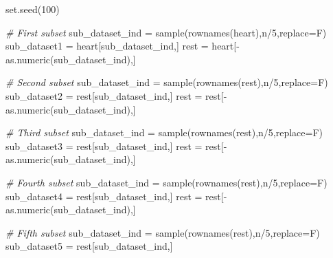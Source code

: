 \documentclass[
]{article}
\newenvironment{Shaded}{\begin{snugshade}}{\end{snugshade}}
\newcommand{\AttributeTok}[1]{\textcolor[rgb]{0.77,0.63,0.00}{#1}}
\newcommand{\CommentTok}[1]{\textcolor[rgb]{0.56,0.35,0.01}{\textit{#1}}}
\newcommand{\DecValTok}[1]{\textcolor[rgb]{0.00,0.00,0.81}{#1}}
\newcommand{\FunctionTok}[1]{\textcolor[rgb]{0.00,0.00,0.00}{#1}}
\newcommand{\NormalTok}[1]{#1}
\newcommand{\OtherTok}[1]{\textcolor[rgb]{0.56,0.35,0.01}{#1}}
\newcommand{\SpecialCharTok}[1]{\textcolor[rgb]{0.00,0.00,0.00}{#1}}
\begin{document}
\begin{Shaded}
\begin{Highlighting}[]
\FunctionTok{set.seed}\NormalTok{(}\DecValTok{100}\NormalTok{)}

\CommentTok{\# First subset}
\NormalTok{sub\_dataset\_ind }\OtherTok{=} \FunctionTok{sample}\NormalTok{(}\FunctionTok{rownames}\NormalTok{(heart),n}\SpecialCharTok{/}\DecValTok{5}\NormalTok{,}\AttributeTok{replace=}\NormalTok{F)}
\NormalTok{sub\_dataset1 }\OtherTok{=}\NormalTok{ heart[sub\_dataset\_ind,]}
\NormalTok{rest }\OtherTok{=}\NormalTok{ heart[}\SpecialCharTok{{-}}\FunctionTok{as.numeric}\NormalTok{(sub\_dataset\_ind),]}

\CommentTok{\# Second subset}
\NormalTok{sub\_dataset\_ind }\OtherTok{=} \FunctionTok{sample}\NormalTok{(}\FunctionTok{rownames}\NormalTok{(rest),n}\SpecialCharTok{/}\DecValTok{5}\NormalTok{,}\AttributeTok{replace=}\NormalTok{F)}
\NormalTok{sub\_dataset2 }\OtherTok{=}\NormalTok{ rest[sub\_dataset\_ind,]}
\NormalTok{rest }\OtherTok{=}\NormalTok{ rest[}\SpecialCharTok{{-}}\FunctionTok{as.numeric}\NormalTok{(sub\_dataset\_ind),]}

\CommentTok{\# Third subset}
\NormalTok{sub\_dataset\_ind }\OtherTok{=} \FunctionTok{sample}\NormalTok{(}\FunctionTok{rownames}\NormalTok{(rest),n}\SpecialCharTok{/}\DecValTok{5}\NormalTok{,}\AttributeTok{replace=}\NormalTok{F)}
\NormalTok{sub\_dataset3 }\OtherTok{=}\NormalTok{ rest[sub\_dataset\_ind,]}
\NormalTok{rest }\OtherTok{=}\NormalTok{ rest[}\SpecialCharTok{{-}}\FunctionTok{as.numeric}\NormalTok{(sub\_dataset\_ind),]}

\CommentTok{\# Fourth subset}
\NormalTok{sub\_dataset\_ind }\OtherTok{=} \FunctionTok{sample}\NormalTok{(}\FunctionTok{rownames}\NormalTok{(rest),n}\SpecialCharTok{/}\DecValTok{5}\NormalTok{,}\AttributeTok{replace=}\NormalTok{F)}
\NormalTok{sub\_dataset4 }\OtherTok{=}\NormalTok{ rest[sub\_dataset\_ind,]}
\NormalTok{rest }\OtherTok{=}\NormalTok{ rest[}\SpecialCharTok{{-}}\FunctionTok{as.numeric}\NormalTok{(sub\_dataset\_ind),]}

\CommentTok{\# Fifth subset}
\NormalTok{sub\_dataset\_ind }\OtherTok{=} \FunctionTok{sample}\NormalTok{(}\FunctionTok{rownames}\NormalTok{(rest),n}\SpecialCharTok{/}\DecValTok{5}\NormalTok{,}\AttributeTok{replace=}\NormalTok{F)}
\NormalTok{sub\_dataset5 }\OtherTok{=}\NormalTok{ rest[sub\_dataset\_ind,]}


\end{Highlighting}
\end{Shaded}
\end{document}
